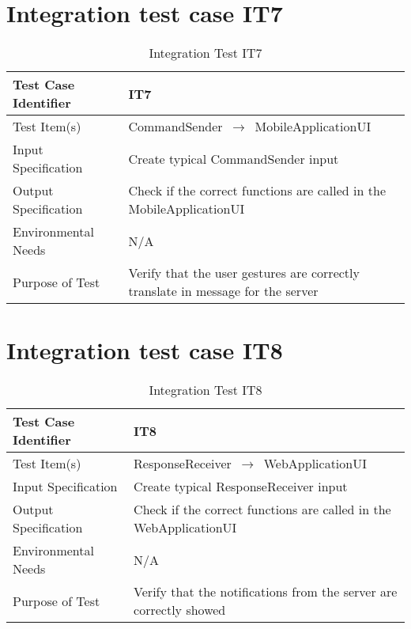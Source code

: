 \documentclass[../../testPlan.tex]{subfiles}
\begin{document}
	\section{Integration test case IT7}
		\begin{table}[H]
			\centering
			\label{IT7}
			\begin{tabular}{ll}
				\hline
				Test Case Identifier & IT7  \\ \hline
				Test Item(s)         & CommandSender $\,\to\,$ MobileApplicationUI\\ \hline
				Input Specification  & Create typical CommandSender input  \\ \hline
				Output Specification & Check if the correct functions are called in the MobileApplicationUI\\ \hline
				Environmental Needs  &  N/A \\ \hline
				Purpose of Test      &  Verify that the user gestures are correctly translate in message for the server  \\ \hline
			\end{tabular}
			\caption{Integration Test IT7}
		\end{table}
		
		
	\section{Integration test case IT8}
		\begin{table}[H]
			\centering
			\label{IT8}
			\begin{tabular}{ll}
				\hline
				Test Case Identifier & IT8  \\ \hline
				Test Item(s)         & ResponseReceiver $\,\to\,$ WebApplicationUI\\ \hline
				Input Specification  & Create typical ResponseReceiver input  \\ \hline
				Output Specification & Check if the correct functions are called in the WebApplicationUI\\ \hline
				Environmental Needs  &  N/A \\ \hline
				Purpose of Test      &  Verify that the notifications from the server are correctly showed\\ \hline
			\end{tabular}
			\caption{Integration Test IT8}
		\end{table}
		
		
\end{document}
